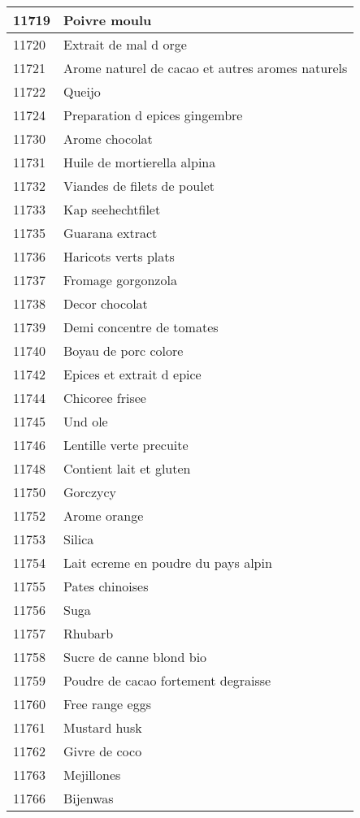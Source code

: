 \begin{longtable}{|l|l|}
11719 & Poivre moulu \\ \hline 
11720 & Extrait de mal d orge \\ \hline 
11721 & Arome naturel de cacao et autres aromes naturels \\ \hline 
11722 & Queijo \\ \hline 
11724 & Preparation d epices gingembre \\ \hline 
11730 & Arome chocolat \\ \hline 
11731 & Huile de mortierella alpina \\ \hline 
11732 & Viandes de filets de poulet \\ \hline 
11733 & Kap seehechtfilet \\ \hline 
11735 & Guarana extract \\ \hline 
11736 & Haricots verts plats \\ \hline 
11737 & Fromage gorgonzola \\ \hline 
11738 & Decor chocolat \\ \hline 
11739 & Demi concentre de tomates \\ \hline 
11740 & Boyau de porc colore \\ \hline 
11742 & Epices et extrait d epice \\ \hline 
11744 & Chicoree frisee \\ \hline 
11745 & Und ole \\ \hline 
11746 & Lentille verte precuite \\ \hline 
11748 & Contient lait et gluten \\ \hline 
11750 & Gorczycy \\ \hline 
11752 & Arome orange \\ \hline 
11753 & Silica \\ \hline 
11754 & Lait ecreme en poudre du pays alpin \\ \hline 
11755 & Pates chinoises \\ \hline 
11756 & Suga \\ \hline 
11757 & Rhubarb \\ \hline 
11758 & Sucre de canne blond bio \\ \hline 
11759 & Poudre de cacao fortement degraisse \\ \hline 
11760 & Free range eggs \\ \hline 
11761 & Mustard husk \\ \hline 
11762 & Givre de coco \\ \hline 
11763 & Mejillones \\ \hline 
11766 & Bijenwas \\ \hline 

\end{longtable}
